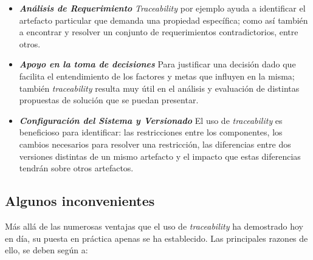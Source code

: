 \documentclass[a4paper,12pt,twoside,spanish,openright]{book}
\begin{document}
\begin{itemize}
\item \textit{\textbf{Análisis de Requerimiento}} \textit{Traceability} por ejemplo ayuda a identificar el artefacto particular que demanda una propiedad específica; como así también a encontrar y resolver un conjunto de requerimientos contradictorios, entre otros.

\item \textit{\textbf{Apoyo en la toma de decisiones}} Para justificar una decisión dado que facilita el entendimiento de los factores y metas que influyen en la misma; también \textit{traceability} resulta muy útil en el análisis y evaluación de distintas propuestas de solución que se puedan presentar.

\item \textit{\textbf{Configuración del Sistema y Versionado}} El uso de \textit{traceability} es beneficioso para identificar: las restricciones entre los componentes, los cambios necesarios para resolver una restricción, las diferencias entre dos versiones distintas de un mismo artefacto y el impacto que estas diferencias tendrán sobre otros artefactos.

\end{itemize}


\subsection{Algunos inconvenientes}

Más allá de las numerosas ventajas que el uso de \textit{traceability} ha demostrado hoy en día, su puesta en práctica apenas se ha establecido. Las principales razones de ello, se deben según \cite{GrammelVoigt} a:
\end{document}
